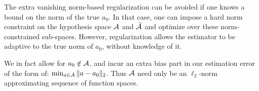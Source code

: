 \begin{remark} 
The extra vanishing norm-based regularization can be avoided if one knows a bound on the norm of the true $a_0$. In that case, one can impose a hard norm constraint on the hypothesis space ${\mathcal A}$ and $\bar{{\mathcal A}}$ and optimize over these norm-constrained sub-spaces. However, regularization allows the estimator to be adaptive to the true norm of $a_0$, without knowledge of it.
\end{remark}

\begin{remark}
We in fact allow for $a_0\notin {\mathcal A}$, and incur an extra bias part in our estimation error of the form of: $\min_{a\in {\mathcal A}} \|a-a_0\|_{2}$. Thus ${\mathcal A}$ need only be an $\ell_2$-norm approximating sequence of function spaces.
\end{remark}